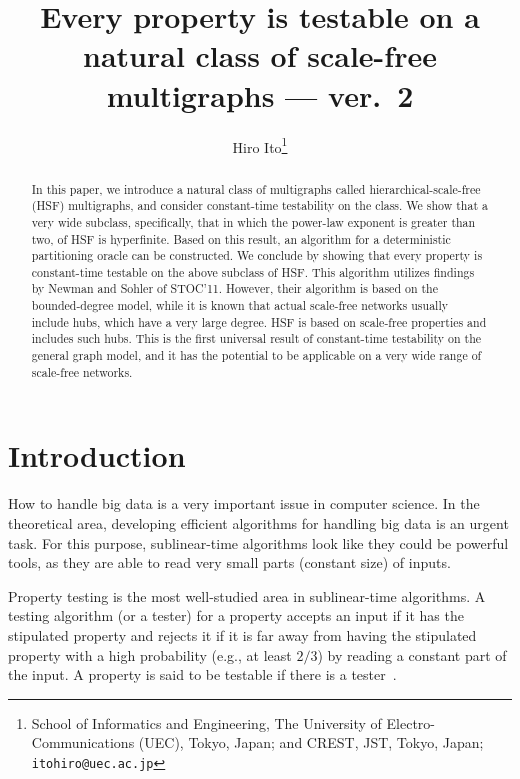 \documentclass[11pt]{article}
\title{Every property is testable on a natural class of scale-free multigraphs --- ver.~2}
\author{
Hiro Ito\thanks{
     School of Informatics and Engineering, 
    The University of Electro-Communications (UEC), 
    Tokyo, Japan; and
    CREST, JST, Tokyo, Japan; 
    {\tt itohiro@uec.ac.jp}
    }
}
\begin{document}
\setcounter{page}{0}

\maketitle



\begin{abstract}
In this paper, we introduce a natural class of multigraphs called hierarchical-scale-free (HSF) multigraphs, and consider constant-time testability on the class. 
We show that a very wide subclass, specifically, that in which the power-law exponent is greater than two, 
of HSF is hyperfinite. 
Based on this result, an algorithm for a deterministic partitioning oracle can 
be constructed.  
We conclude by showing that every property is constant-time testable 
on the above subclass of HSF. 
This algorithm utilizes findings by Newman and Sohler of STOC'11.  
However, their algorithm is based on the bounded-degree model, 
while it is known that actual scale-free networks 
usually include hubs, which have a very large degree.  
HSF is based on scale-free properties and includes such hubs.
This is the first universal result of constant-time testability on  
the general graph model, and it has the potential to be applicable on  a very wide range of scale-free networks. 
\end{abstract}


\newpage
\section{Introduction}




How to handle big data is a very important issue in computer science. 
In the theoretical area, developing efficient algorithms for handling big data 
is an urgent task. 
For this purpose, sublinear-time algorithms look like they could be powerful tools, 
as they are able to read very small parts (constant size) of inputs. 

Property testing is the most well-studied area in sublinear-time algorithms. 
A testing algorithm (or a tester) for a property accepts an input if it has the stipulated property and rejects it if it is far away from having the stipulated property with a high probability (e.g., at least $2/3$) by reading 
a constant part of the input. 
A property is said to be testable if there is a tester~\cite{PropertyTestingLNCS10}. 
\end{document}
